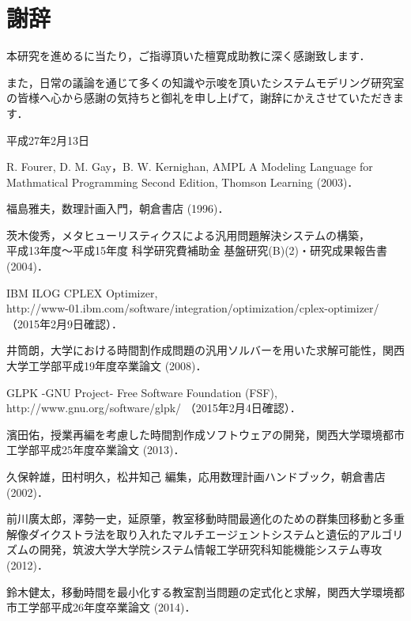 \documentclass[12pt, a4paper, fleqn]{jreport}
\begin{document}
\newpage
\chapter*{謝辞}

本研究を進めるに当たり，ご指導頂いた檀寛成助教に深く感謝致します．

また，日常の議論を通じて多くの知識や示唆を頂いたシステムモデリング研究室の皆様へ心から感謝の気持ちと御礼を申し上げて，謝辞にかえさせていただきます．

\begin{flushright} 
平成27年2月13日
\end{flushright} 


\newpage
\begin{thebibliography}{9}

R. Fourer, D. M. Gay，B. W. Kernighan, AMPL A Modeling Language for Mathmatical Programming Second Edition, Thomson Learning (2003)．

福島雅夫，数理計画入門，朝倉書店 (1996)．

茨木俊秀，メタヒューリスティクスによる汎用問題解決システムの構築，\\
平成13年度～平成15年度 科学研究費補助金 基盤研究(B)(2)・研究成果報告書 (2004)．

IBM ILOG CPLEX Optimizer,\\
 http://www-01.ibm.com/software/integration/optimization/cplex-optimizer/\\
 （2015年2月9日確認）．

井筒朗，大学における時間割作成問題の汎用ソルバーを用いた求解可能性，関西大学工学部平成19年度卒業論文 (2008)．

GLPK -GNU Project- Free Software Foundation (FSF),　　　　　　　　　　　　
 http://www.gnu.org/software/glpk/ （2015年2月4日確認）．

濱田佑，授業再編を考慮した時間割作成ソフトウェアの開発，関西大学環境都市工学部平成25年度卒業論文 (2013)．

久保幹雄，田村明久，松井知己 編集，応用数理計画ハンドブック，朝倉書店 (2002)．

前川廣太郎，澤勢一史，延原肇，教室移動時間最適化のための群集団移動と多重解像ダイクストラ法を取り入れたマルチエージェントシステムと遺伝的アルゴリズムの開発，筑波大学大学院システム情報工学研究科知能機能システム専攻 (2012)．

鈴木健太，移動時間を最小化する教室割当問題の定式化と求解，関西大学環境都市工学部平成26年度卒業論文 (2014)．


\end{thebibliography}









\appendix
\def\thechapter{\Alph{chapter}}


\end{document}
